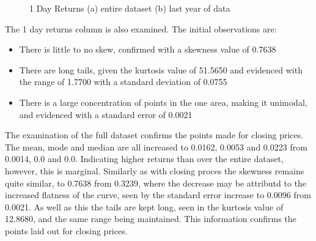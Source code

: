 \begin{figure}[h!]
    \centering
    \caption{1 Day Returns (a) entire dataset (b) last year of data}
    \label{fig:1returnDesc}
\end{figure}

The 1 day returns column is also examined. The initial observations are:
\begin{itemize}
    \item There is little to no skew, confirmed with a skewness value of 0.7638
    \item There are long tails, given the kurtosis value of 51.5650 and evidenced with the range of 1.7700 with a standard deviation of 0.0755
    \item There is a large concentration of points in the one area, making it unimodal, and evidenced with a standard error of 0.0021
\end{itemize}
The examination of the full dataset confirms the points made for closing prices. The mean, mode and median are all increased to 0.0162, 0.0053 and 0.0223 from 0.0014, 0.0 and 0.0. Indicating higher returns than over the entire dataset, however, this is marginal. Similarly as with closing proces the skewness remains quite similar, to 0.7638 from 0.3239, where the decrease may be attributd to the increased flatness of the curve, seen by the standard error increase to 0.0096 from 0.0021. As well as this the tails are kept long, seen in the kurtosis value of 12.8680, and the same range being maintained. This information confirms the points laid out for closing prices.

